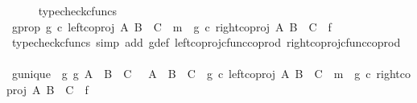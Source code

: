\begin{isabellebody}
\ \ \ \ \isamarkupfalse%
\ typecheck{\isacharunderscore}{\kern0pt}cfuncs\isanewline
\ \ \isamarkupfalse%
\ g{\isacharunderscore}{\kern0pt}prop{\isacharcolon}{\kern0pt}\ {\isachardoublequoteopen}{\isacharparenleft}{\kern0pt}g\ {\isasymcirc}\isactrlsub c\ {\isacharparenleft}{\kern0pt}left{\isacharunderscore}{\kern0pt}coproj\ A\ {\isacharparenleft}{\kern0pt}B\ {\isasymCoprod}\ C{\isacharparenright}{\kern0pt}{\isacharparenright}{\kern0pt}\ {\isacharequal}{\kern0pt}\ m{\isacharparenright}{\kern0pt}\ {\isasymand}\ {\isacharparenleft}{\kern0pt}g\ {\isasymcirc}\isactrlsub c\ {\isacharparenleft}{\kern0pt}right{\isacharunderscore}{\kern0pt}coproj\ A\ {\isacharparenleft}{\kern0pt}B\ {\isasymCoprod}\ C{\isacharparenright}{\kern0pt}{\isacharparenright}{\kern0pt}\ {\isacharequal}{\kern0pt}\ f{\isacharparenright}{\kern0pt}{\isachardoublequoteclose}\isanewline
\ \ \ \ \isamarkupfalse%
\ {\isacharparenleft}{\kern0pt}typecheck{\isacharunderscore}{\kern0pt}cfuncs{\isacharcomma}{\kern0pt}\ simp\ add{\isacharcolon}{\kern0pt}\ g{\isacharunderscore}{\kern0pt}def\ left{\isacharunderscore}{\kern0pt}coproj{\isacharunderscore}{\kern0pt}cfunc{\isacharunderscore}{\kern0pt}coprod\ right{\isacharunderscore}{\kern0pt}coproj{\isacharunderscore}{\kern0pt}cfunc{\isacharunderscore}{\kern0pt}coprod{\isacharparenright}{\kern0pt}\ \isanewline
\ \ \isamarkupfalse%
\ g{\isacharunderscore}{\kern0pt}unique{\isacharcolon}{\kern0pt}\ {\isachardoublequoteopen}{\isasymexists}{\isacharbang}{\kern0pt}\ g{\isachardot}{\kern0pt}\ {\isacharparenleft}{\kern0pt}{\isacharparenleft}{\kern0pt}g{\isacharcolon}{\kern0pt}\ A\ {\isasymCoprod}\ {\isacharparenleft}{\kern0pt}B\ {\isasymCoprod}\ C{\isacharparenright}{\kern0pt}\ \ {\isasymrightarrow}\ {\isacharparenleft}{\kern0pt}A\ {\isasymCoprod}\ B{\isacharparenright}{\kern0pt}\ {\isasymCoprod}\ C{\isacharparenright}{\kern0pt}\ {\isasymand}\ {\isacharparenleft}{\kern0pt}g\ {\isasymcirc}\isactrlsub c\ {\isacharparenleft}{\kern0pt}left{\isacharunderscore}{\kern0pt}coproj\ A\ {\isacharparenleft}{\kern0pt}B\ {\isasymCoprod}\ C{\isacharparenright}{\kern0pt}{\isacharparenright}{\kern0pt}\ {\isacharequal}{\kern0pt}\ m{\isacharparenright}{\kern0pt}\ {\isasymand}\ {\isacharparenleft}{\kern0pt}g\ {\isasymcirc}\isactrlsub c\ {\isacharparenleft}{\kern0pt}right{\isacharunderscore}{\kern0pt}coproj\ A\ {\isacharparenleft}{\kern0pt}B\ {\isasymCoprod}\ C{\isacharparenright}{\kern0pt}{\isacharparenright}{\kern0pt}\ {\isacharequal}{\kern0pt}\ f{\isacharparenright}{\kern0pt}{\isacharparenright}{\kern0pt}{\isachardoublequoteclose}\isanewline

\end{isabellebody}
